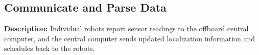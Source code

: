 \subsection{Communicate and Parse Data}
\textbf{Description:} Individual robots report sensor readings to the offboard central computer, and the central computer sends updated localization information and schedules back to the robots. 

